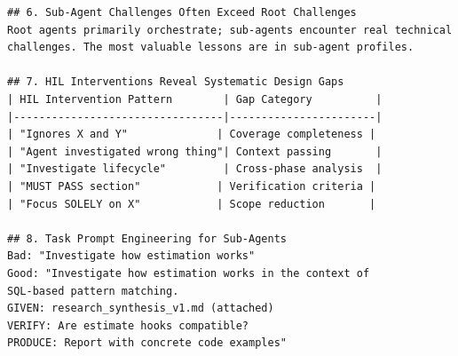 \begin{listing}[H]
{\begin{lstlisting}
## 6. Sub-Agent Challenges Often Exceed Root Challenges
Root agents primarily orchestrate; sub-agents encounter real technical
challenges. The most valuable lessons are in sub-agent profiles.

## 7. HIL Interventions Reveal Systematic Design Gaps
| HIL Intervention Pattern        | Gap Category          |
|---------------------------------|-----------------------|
| "Ignores X and Y"              | Coverage completeness |
| "Agent investigated wrong thing"| Context passing       |
| "Investigate lifecycle"         | Cross-phase analysis  |
| "MUST PASS section"            | Verification criteria |
| "Focus SOLELY on X"            | Scope reduction       |

## 8. Task Prompt Engineering for Sub-Agents
Bad: "Investigate how estimation works"
Good: "Investigate how estimation works in the context of
SQL-based pattern matching.
GIVEN: research_synthesis_v1.md (attached)
VERIFY: Are estimate hooks compatible?
PRODUCE: Report with concrete code examples"
\end{lstlisting}
}
\caption{Meta-agent lessons from the distributed DuckDB project, part~1 of~2 (condensed). Lessons 1--8 cover context management, parallelism, verification, and prompt engineering.}
\label{lst:duckdb_lessons}
\end{listing}

